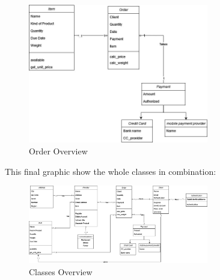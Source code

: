 \begin{figure}[H]
    \centering
    \includegraphics[width=0.7\textwidth]{assets/order_cd.jpg}
    \caption{Order Overview}
    \label{fig:order_cd}
\end{figure}

This final graphic show the whole classes in combination:

\begin{figure}[H]
    \centering
    \includegraphics[width=0.7\textwidth]{assets/classes_CD.jpg}
    \caption{Classes Overview}
    \label{fig:class_CD}
\end{figure}

 
